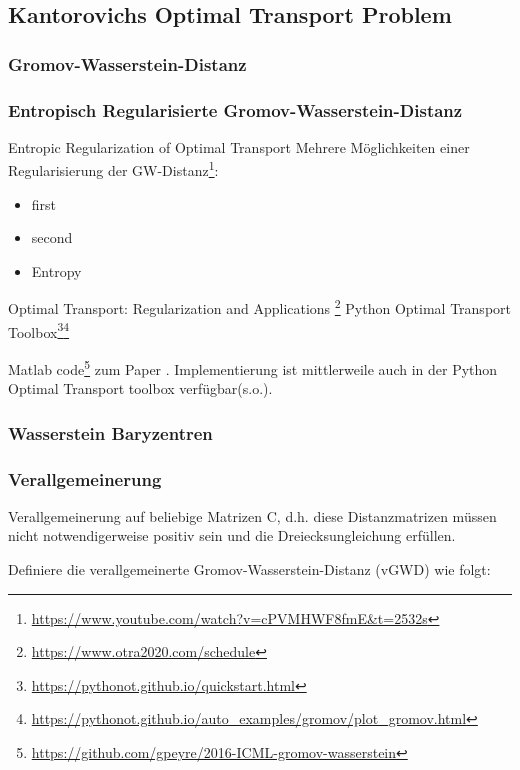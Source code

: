 \documentclass[twoside, 12pt,a4paper]{article}
\numberwithin{equation}{section}
\begin{document}
	
	
	\subsection{Kantorovichs Optimal Transport Problem}
	
	\subsubsection{Gromov-Wasserstein-Distanz}
	
	\subsubsection{Entropisch Regularisierte Gromov-Wasserstein-Distanz}
	Entropic Regularization of Optimal Transport \cite{computationalOT}
	Mehrere Möglichkeiten einer Regularisierung der GW-Distanz\footnote{\url{https://www.youtube.com/watch?v=cPVMHWF8fmE&t=2532s}}:
	\begin{itemize}
		\item first\\
		\item second \\
		\item Entropy
	\end{itemize} 
	
	Optimal Transport: Regularization and Applications
	\footnote{\url{https://www.otra2020.com/schedule}}
	Python Optimal Transport Toolbox\footnote{\url{https://pythonot.github.io/quickstart.html}}\footnote{\url{https://pythonot.github.io/auto_examples/gromov/plot_gromov.html}}
	
	Matlab code\footnote{\url{https://github.com/gpeyre/2016-ICML-gromov-wasserstein}} zum Paper \cite{gwd_averaging_kernels}.
	Implementierung ist mittlerweile auch in der Python Optimal Transport toolbox verfügbar(s.o.).
	
	\subsubsection{Wasserstein Baryzentren}
	
	\subsubsection{Verallgemeinerung}
	Verallgemeinerung auf beliebige  Matrizen C, d.h. diese Distanzmatrizen müssen nicht notwendigerweise positiv sein und die Dreiecksungleichung erfüllen.
	
	Definiere die verallgemeinerte Gromov-Wasserstein-Distanz (vGWD) wie folgt:
	
\end{document}
